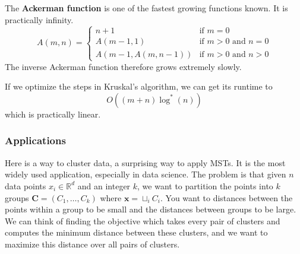 \documentclass{article}
\begin{document}
      \begin{definition}
        The \textbf{Ackerman function} is one of the fastest growing functions known. It is practically infinity. 
        \begin{equation}
          A(m,n) = 
          \begin{cases} 
            n+1 & \text{if } m = 0 \\
            A(m-1,1) & \text{if } m > 0 \text{ and } n = 0 \\
            A(m-1,A(m,n-1)) & \text{if } m > 0 \text{ and } n > 0
          \end{cases} 
        \end{equation}
        The inverse Ackerman function therefore grows extremely slowly. 
      \end{definition}

      If we optimize the steps in Kruskal's algorithm, we can get its runtime to 
      \begin{equation}
        O((m + n) \log^{\ast} (n))
      \end{equation}
      which is practically linear. 

    \subsubsection{Applications}

      Here is a way to cluster data, a surprising way to apply MSTs. It is the most widely used application, especially in data science. The problem is that given $n$ data points $x_i \in \mathbb{R}^d$ and an integer $k$, we want to partition the points into $k$ groups $\mathbf{C} = (C_1, \ldots, C_k)$ where $\mathbf{x} = \sqcup_i C_i$. You want to distances between the points within a group to be small and the distances between groups to be large. We can think of finding the objective which takes every pair of clusters and computes the minimum distance between these clusters, and we want to maximize this distance over all pairs of clusters.  
\end{document}
